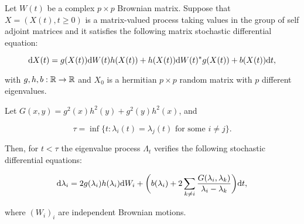 \begin{theorem}
    Let $W(t)$ be a complex $p\times p$ Brownian matrix. Suppose that $X = (X(t), t \ge 0)$ is a matrix-valued process taking values in the group of self adjoint matrices and it satisfies the following matrix stochastic differential equation:

    \begin{equation}\label{eq:complex_diff}
        \mathrm d X(t) = g(X(t))\mathrm d  W(t) h(X(t)) + h(X(t))\mathrm d W(t)^* g(X(t)) + b(X(t))\mathrm d t,
    \end{equation}

    \noindent with $g,h,b: \mathbb R \to \mathbb R$ and $X_0$ is a hermitian $p\times p$ random matrix with $p$ different eigenvalues.

    Let $G(x,y) = g^2(x)h^2(y) + g^2(y)h^2(x)$, and
    
    \[ \tau = \inf\{ t: \lambda_i(t) = \lambda_j(t) \text{ for some } i\neq j \}. \]
    
    Then, for $t < \tau$ the eigenvalue process $\Lambda_t$ verifies the following stochastic differential equations:

    \begin{equation}
        \mathrm d \lambda_i = 2g(\lambda_i)h(\lambda_i)\mathrm d W_i + \biggl( b(\lambda_i) + 2\sum_{k\neq i} \frac{G(\lambda_i,\lambda_k)}{\lambda_i - \lambda_k} \biggr)\mathrm d t,
    \end{equation}

    \noindent where $(W_i)_{i}$ are independent Brownian motions.
\end{theorem}

